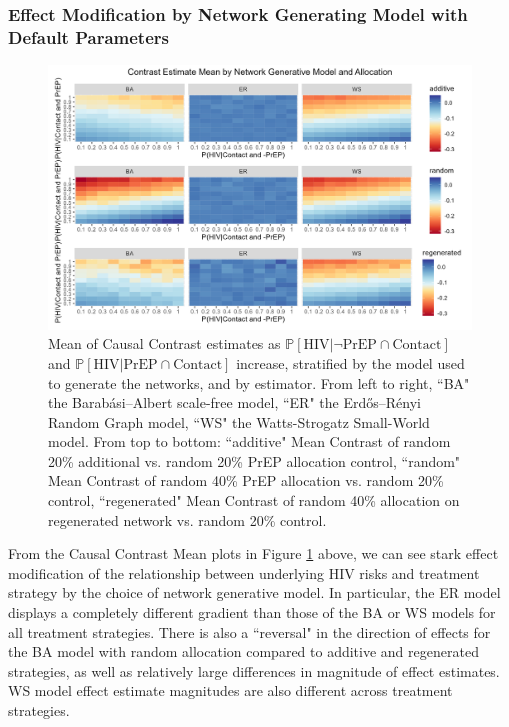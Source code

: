 \documentclass{article}
\theoremstyle{definition}
\begin{document}
\subsubsection{Effect Modification by Network Generating Model with Default Parameters}
\begin{figure}[H]
    \centering
    \includegraphics[width=\linewidth]{Figures/Generative Model Mean plots.png}
    \caption{Mean of Causal Contrast estimates as $\mathbb{P}\left[\text{HIV} \vert \neg \text{PrEP} \cap \text{Contact}\right]$ and $\mathbb{P}\left[\text{HIV} \vert \text{PrEP} \cap \text{Contact}\right]$ increase, stratified by the model used to generate the networks, and by estimator. From left to right, ``BA" the Barabási–Albert scale-free model, ``ER" the Erdős–Rényi Random Graph model, ``WS" the Watts-Strogatz Small-World model. From top to bottom: ``additive" Mean Contrast of random 20\% additional vs. random 20\% PrEP allocation control, ``random" Mean Contrast of random 40\% PrEP allocation vs. random 20\% control, ``regenerated" Mean Contrast of random 40\% allocation on regenerated network vs. random 20\% control. }
    \label{fig:Figure S4.17}
\end{figure}
From the Causal Contrast Mean plots in Figure \ref{fig:Figure S4.17} above, we can see stark effect modification of the relationship between underlying HIV risks and treatment strategy by the choice of network generative model. In particular, the ER model displays a completely different gradient than those of the BA or WS models for all treatment strategies. There is also a ``reversal" in the direction of effects for the BA model with random allocation compared to additive and regenerated strategies, as well as relatively large differences in magnitude of effect estimates. WS model effect estimate magnitudes are also different across treatment strategies. 
\end{document}
